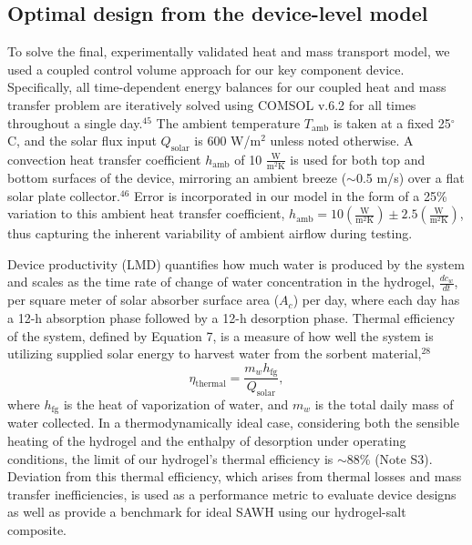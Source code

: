 \documentclass[11pt]{article}
\begin{document}
\subsection{Optimal design from the device-level model}

To solve the final, experimentally validated heat and mass transport model, we used a coupled control volume approach for our key component device. Specifically, all time-dependent energy balances for our coupled heat and mass transfer problem are iteratively solved using COMSOL v.6.2 for all times throughout a single day.$^{45}$ The ambient temperature $T_{\mathrm{amb}}$ is taken at a fixed 25$^{\circ}$C, and the solar flux input $Q_{\mathrm{solar}}$ is 600 W/m$^{2}$ unless noted otherwise. A convection heat transfer coefficient $h_{\mathrm{amb}}$ of 10 $\frac{\mathrm{W}}{\mathrm{m^{2}K}}$ is used for both top and bottom surfaces of the device, mirroring an ambient breeze ($\sim$0.5 m/s) over a flat solar plate collector.$^{46}$ Error is incorporated in our model in the form of a 25\% variation to this ambient heat transfer coefficient, $h_{\mathrm{amb}} = 10\left(\frac{\mathrm{W}}{\mathrm{m^{2}K}}\right) \pm 2.5\left(\frac{\mathrm{W}}{\mathrm{m^{2}K}}\right)$, thus capturing the inherent variability of ambient airflow during testing.

Device productivity (LMD) quantifies how much water is produced by the system and scales as the time rate of change of water concentration in the hydrogel, $\frac{dc_{w}}{dt}$, per square meter of solar absorber surface area ($A_{c}$) per day, where each day has a 12-h absorption phase followed by a 12-h desorption phase. Thermal efficiency of the system, defined by Equation 7, is a measure of how well the system is utilizing supplied solar energy to harvest water from the sorbent material,$^{28}$
\begin{equation}
\eta_{\mathrm{thermal}} = \frac{m_{w}h_{\mathrm{fg}}}{Q_{\mathrm{solar}}},
\end{equation}
where $h_{\mathrm{fg}}$ is the heat of vaporization of water, and $m_{w}$ is the total daily mass of water collected. In a thermodynamically ideal case, considering both the sensible heating of the hydrogel and the enthalpy of desorption under operating conditions, the limit of our hydrogel's thermal efficiency is $\sim$88\% (Note S3). Deviation from this thermal efficiency, which arises from thermal losses and mass transfer inefficiencies, is used as a performance metric to evaluate device designs as well as provide a benchmark for ideal SAWH using our hydrogel-salt composite.
\end{document}
